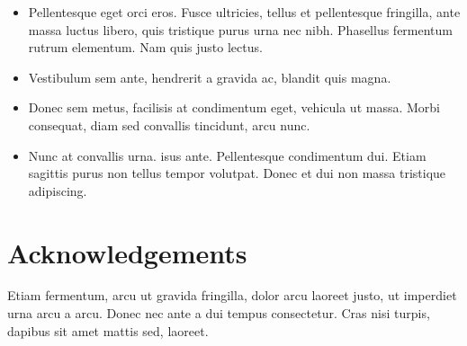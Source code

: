 \documentclass[a0,landscape]{a0poster}
\begin{document}
\begin{multicols}{4}
\begin{itemize}
\item Pellentesque eget orci eros. Fusce ultricies, tellus et pellentesque fringilla, ante massa luctus libero, quis tristique purus urna nec nibh. Phasellus fermentum rutrum elementum. Nam quis justo lectus.
\item Vestibulum sem ante, hendrerit a gravida ac, blandit quis magna.
\item Donec sem metus, facilisis at condimentum eget, vehicula ut massa. Morbi consequat, diam sed convallis tincidunt, arcu nunc.
\item Nunc at convallis urna. isus ante. Pellentesque condimentum dui. Etiam sagittis purus non tellus tempor volutpat. Donec et dui non massa tristique adipiscing.
\end{itemize}

\color{DarkSlateGray} %



\nocite{*} %


\section*{Acknowledgements}

Etiam fermentum, arcu ut gravida fringilla, dolor arcu laoreet justo, ut imperdiet urna arcu a arcu. Donec nec ante a dui tempus consectetur. Cras nisi turpis, dapibus sit amet mattis sed, laoreet.


\end{multicols}
\end{document}
